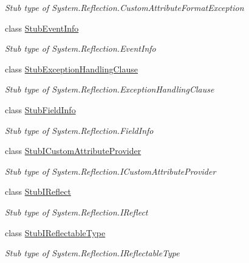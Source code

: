 \begin{DoxyCompactItemize}
\begin{DoxyCompactList}\small\item\em Stub type of System.\-Reflection.\-Custom\-Attribute\-Format\-Exception\end{DoxyCompactList}\item 
class \hyperlink{class_system_1_1_reflection_1_1_fakes_1_1_stub_event_info}{Stub\-Event\-Info}
\begin{DoxyCompactList}\small\item\em Stub type of System.\-Reflection.\-Event\-Info\end{DoxyCompactList}\item 
class \hyperlink{class_system_1_1_reflection_1_1_fakes_1_1_stub_exception_handling_clause}{Stub\-Exception\-Handling\-Clause}
\begin{DoxyCompactList}\small\item\em Stub type of System.\-Reflection.\-Exception\-Handling\-Clause\end{DoxyCompactList}\item 
class \hyperlink{class_system_1_1_reflection_1_1_fakes_1_1_stub_field_info}{Stub\-Field\-Info}
\begin{DoxyCompactList}\small\item\em Stub type of System.\-Reflection.\-Field\-Info\end{DoxyCompactList}\item 
class \hyperlink{class_system_1_1_reflection_1_1_fakes_1_1_stub_i_custom_attribute_provider}{Stub\-I\-Custom\-Attribute\-Provider}
\begin{DoxyCompactList}\small\item\em Stub type of System.\-Reflection.\-I\-Custom\-Attribute\-Provider\end{DoxyCompactList}\item 
class \hyperlink{class_system_1_1_reflection_1_1_fakes_1_1_stub_i_reflect}{Stub\-I\-Reflect}
\begin{DoxyCompactList}\small\item\em Stub type of System.\-Reflection.\-I\-Reflect\end{DoxyCompactList}\item 
class \hyperlink{class_system_1_1_reflection_1_1_fakes_1_1_stub_i_reflectable_type}{Stub\-I\-Reflectable\-Type}
\begin{DoxyCompactList}\small\item\em Stub type of System.\-Reflection.\-I\-Reflectable\-Type\end{DoxyCompactList}\item 

\end{DoxyCompactItemize}
